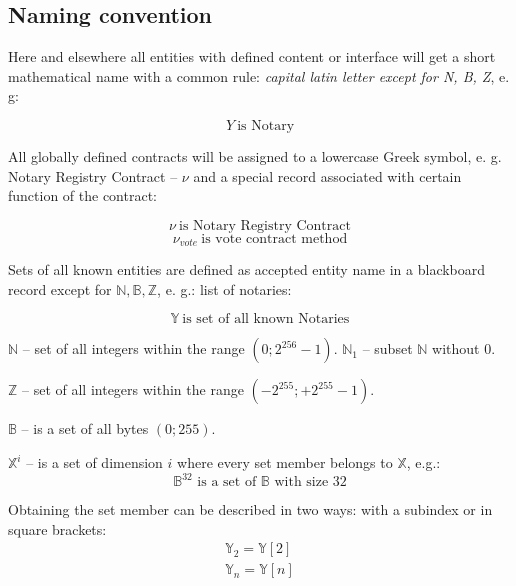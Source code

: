 \documentclass[12pt]{report}
\begin{document}
\subsection{Naming convention}
\label{tech-review-naming}
Here and elsewhere all entities with defined content or interface will get a short mathematical name with a common rule: \textit{capital latin letter except for N, B, Z}, e. g:

\begin{equation}
Y \ \text{is Notary}
\end{equation}

All globally defined contracts will be assigned to a lowercase Greek symbol, e. g. Notary Registry Contract – $\nu$ and a special record associated with certain function of the contract:

\begin{equation}
\nu \ \text{is Notary Registry Contract}
\end{equation}
\begin{equation}
\nu_{vote} \ \text{is vote contract method}
\end{equation}

Sets of all known entities are defined as accepted entity name in a blackboard record except for $\mathbb{N}, \mathbb{B}, \mathbb{Z}$, e. g.: list of notaries:

\begin{equation}
\mathbb{Y} \ \text{is set of all known Notaries}
\end{equation}

$\mathbb{N}$ – set of all integers within the range $(0; 2^{256} - 1)$. $\mathbb{N}_1$ – subset $\mathbb{N}$ without 0.

$\mathbb{Z}$ – set of all integers within the range $(-2^{255}; +2^{255} - 1)$.

$\mathbb{B}$ – is a set of all bytes $(0; 255)$. 

$\mathbb{X}^{i}$ – is a set of dimension $i$ where every set member belongs to $\mathbb{X}$, e.g.:
\begin{equation}
\mathbb{B}^{32} \text{ is a set of } \mathbb{B} \text{ with size } 32
\end{equation}

Obtaining the set member can be described in two ways: with a subindex or in square brackets:
\begin{equation}
\begin{aligned}
\mathbb{Y}_2 = \mathbb{Y}[2] \\
\mathbb{Y}_n = \mathbb{Y}[n] 
\end{aligned}
\end{equation}
\end{document}
